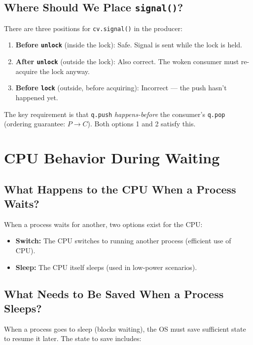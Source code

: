 \documentclass[11pt]{article}
\begin{document}
\subsection{Where Should We Place \texttt{signal()}?}

There are three positions for \texttt{cv.signal()} in the producer:

\begin{enumerate}
    \item \textbf{Before \texttt{unlock}} (inside the lock): Safe. Signal is sent while the lock is held.
    \item \textbf{After \texttt{unlock}} (outside the lock): Also correct. The woken consumer must re-acquire the lock anyway.
    \item \textbf{Before \texttt{lock}} (outside, before acquiring): Incorrect --- the push hasn't happened yet.
\end{enumerate}

The key requirement is that \texttt{q.push} \emph{happens-before} the consumer's \texttt{q.pop} (ordering guarantee: $P \to C$). Both options 1 and 2 satisfy this.

\section{CPU Behavior During Waiting}

\subsection{What Happens to the CPU When a Process Waits?}

When a process waits for another, two options exist for the CPU:
\begin{itemize}
    \item \textbf{Switch:} The CPU switches to running another process (efficient use of CPU).
    \item \textbf{Sleep:} The CPU itself sleeps (used in low-power scenarios).
\end{itemize}

\subsection{What Needs to Be Saved When a Process Sleeps?}

When a process goes to sleep (blocks waiting), the OS must save sufficient state to resume it later. The state to save includes:
\end{document}

